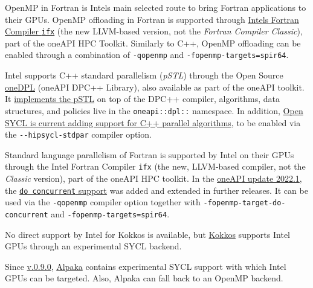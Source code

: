  OpenMP in Fortran is Intel\textquotesingle s main selected route to bring Fortran applications to their GPUs. OpenMP offloading in Fortran is supported through \href{https://www.intel.com/content/www/us/en/docs/fortran-compiler/developer-guide-reference/2023-2/overview.html}{Intel\textquotesingle s Fortran Compiler \texttt{ifx}} (the new LLVM-based version, not the \emph{Fortran Compiler Classic}), part of the oneAPI HPC Toolkit. Similarly to C++, OpenMP offloading can be enabled through a combination of \texttt{-qopenmp} and \texttt{-fopenmp-targets=spir64}.   

 Intel supports C++ standard parallelism (\emph{pSTL}) through the Open Source \href{https://oneapi-src.github.io/oneDPL/index.html}{oneDPL} (oneAPI DPC++ Library), also available as part of the oneAPI toolkit. It \href{https://oneapi-src.github.io/oneDPL/parallel_api_main.html}{implements the pSTL} on top of the DPC++ compiler, algorithms, data structures, and policies live in the \texttt{oneapi::dpl::} namespace. In addition, \href{https://github.com/OpenSYCL/OpenSYCL/pull/1088}{Open SYCL is current adding support for C++ parallel algorithms}, to be enabled via the \texttt{-\/-hipsycl-stdpar} compiler option.   

 Standard language parallelism of Fortran is supported by Intel on their GPUs through the Intel Fortran Compiler \texttt{ifx} (the new, LLVM-based compiler, not the \emph{Classic} version), part of the oneAPI HPC toolkit. In the \href{https://www.intel.com/content/www/us/en/developer/articles/release-notes/fortran-compiler-release-notes.html}{oneAPI update 2022.1}, the \href{https://www.intel.com/content/www/us/en/docs/fortran-compiler/developer-guide-reference/2023-2/do-concurrent.html}{\texttt{do\ concurrent} support} was added and extended in further releases. It can be used via the \texttt{-qopenmp} compiler option together with \texttt{-fopenmp-target-do-concurrent} and \texttt{-fopenmp-targets=spir64}.   

 No direct support by Intel for Kokkos is available, but \href{https://kokkos.github.io/kokkos-core-wiki/}{Kokkos} supports Intel GPUs through an experimental SYCL backend.   

 Since \href{https://github.com/alpaka-group/alpaka/releases/tag/0.9.0}{v.0.9.0}, \href{https://github.com/alpaka-group/alpaka}{Alpaka} contains experimental SYCL support with which Intel GPUs can be targeted. Also, Alpaka can fall back to an OpenMP backend. 


